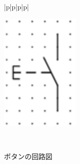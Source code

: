 \begin{figure}[H]
\begin{tabular}{|p{\colH}|p{\colI}|p{\colH}|p{\colI}|}
\begin{minipage}[t]{\linewidth}
      \includegraphics[width=\linewidth]{images/chap05/text05-img045.png}
      \caption{ボタンの回路図}
      \smallskip
    \end{minipage}\\ \hline
  \end{tabular}
\end{figure}
